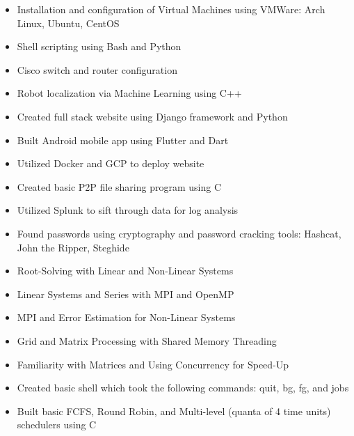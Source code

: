 \documentclass[10pt,a4paper,ragged2e,withhyper]{altacv}
\begin{document}
\begin{paracol}{2}
      \begin{itemize}
          \item Installation and configuration of Virtual Machines using VMWare: Arch Linux, Ubuntu, CentOS
          \item Shell scripting using Bash and Python
          \item Cisco switch and router configuration
          \item Robot localization via Machine Learning using C++
          \item Created full stack website using Django framework and Python
          \item Built Android mobile app using Flutter and Dart
          \item Utilized Docker and GCP to deploy website
          \item Created basic P2P file sharing program using C
          \item Utilized Splunk to sift through data for log analysis
          \item Found passwords using cryptography and password cracking tools: Hashcat, John the Ripper, Steghide
          \item Root-Solving with Linear and Non-Linear Systems
          \item Linear Systems and Series with MPI and OpenMP
          \item MPI and Error Estimation for Non-Linear Systems
          \item Grid and Matrix Processing with Shared Memory Threading
          \item Familiarity with Matrices and Using Concurrency for Speed-Up
          \item Created basic shell which took the following commands: quit, bg, fg, and jobs
          \item Built basic FCFS, Round Robin, and Multi-level (quanta of 4 time units) schedulers using C

      \end{itemize}
      
      \switchcolumn
      
      

      \divider


\end{paracol}
\end{document}
